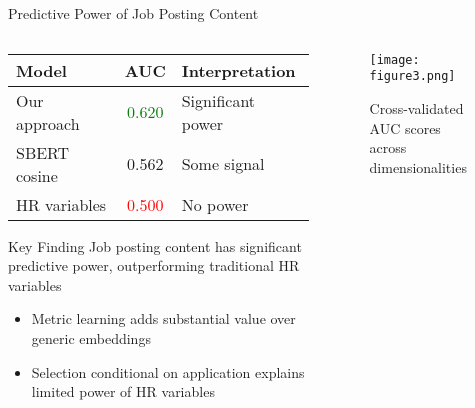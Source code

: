 \documentclass{beamer}
\begin{document}
\begin{frame}{Predictive Power of Job Posting Content}
\begin{columns}
\begin{column}{0.48\textwidth}
\begin{table}
\centering
\begin{tabular}{l c l}
\toprule
\textbf{Model} & \textbf{AUC} & \textbf{Interpretation} \\
\midrule
Our approach & \textcolor{green}{0.620} & Significant power \\
SBERT cosine & 0.562 & Some signal \\
HR variables & \textcolor{red}{0.500} & No power \\
\bottomrule
\end{tabular}
\end{table}

\begin{block}{Key Finding}
Job posting content has significant predictive power, outperforming traditional HR variables
\end{block}

\begin{itemize}
    \item Metric learning adds substantial value over generic embeddings
    \item Selection conditional on application explains limited power of HR variables
\end{itemize}
\end{column}
\begin{column}{0.48\textwidth}
\begin{figure}
\centering
\texttt{[image: figure3.png]}
\caption*{Cross-validated AUC scores across dimensionalities}
\end{figure}
\end{column}
\end{columns}
\end{frame}
\end{document}
